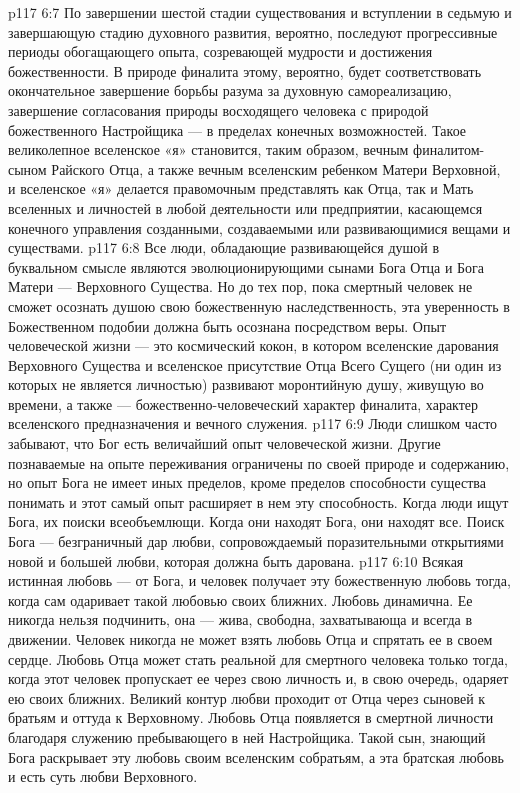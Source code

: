 \vs p117 6:7 По завершении шестой стадии существования и вступлении в седьмую и завершающую стадию духовного развития, вероятно, последуют прогрессивные периоды обогащающего опыта, созревающей мудрости и достижения божественности. В природе финалита этому, вероятно, будет соответствовать окончательное завершение борьбы разума за духовную самореализацию, завершение согласования природы восходящего человека с природой божественного Настройщика --- в пределах конечных возможностей. Такое великолепное вселенское «я» становится, таким образом, вечным финалитом\hyp{}сыном Райского Отца, а также вечным вселенским ребенком Матери Верховной, и вселенское «я» делается правомочным представлять как Отца, так и Мать вселенных и личностей в любой деятельности или предприятии, касающемся конечного управления созданными, создаваемыми или развивающимися вещами и существами.
\vs p117 6:8 Все люди, обладающие развивающейся душой в буквальном смысле являются эволюционирующими сынами Бога Отца и Бога Матери --- Верховного Существа. Но до тех пор, пока смертный человек не сможет осознать душою свою божественную наследственность, эта уверенность в Божественном подобии должна быть осознана посредством веры. Опыт человеческой жизни --- это космический кокон, в котором вселенские дарования Верховного Существа и вселенское присутствие Отца Всего Сущего (ни один из которых не является личностью) развивают моронтийную душу, живущую во времени, а также --- божественно\hyp{}человеческий характер финалита, характер вселенского предназначения и вечного служения.
\vs p117 6:9 \pc Люди слишком часто забывают, что Бог есть величайший опыт человеческой жизни. Другие познаваемые на опыте переживания ограничены по своей природе и содержанию, но опыт Бога не имеет иных пределов, кроме пределов способности существа понимать и этот самый опыт расширяет в нем эту способность. Когда люди ищут Бога, их поиски всеобъемлющи. Когда они находят Бога, они находят все. Поиск Бога --- безграничный дар любви, сопровождаемый поразительными открытиями новой и большей любви, которая должна быть дарована.
\vs p117 6:10 Всякая истинная любовь --- от Бога, и человек получает эту божественную любовь тогда, когда сам одаривает такой любовью своих ближних. Любовь динамична. Ее никогда нельзя подчинить, она --- жива, свободна, захватывающа и всегда в движении. Человек никогда не может взять любовь Отца и спрятать ее в своем сердце. Любовь Отца может стать реальной для смертного человека только тогда, когда этот человек пропускает ее через свою личность и, в свою очередь, одаряет ею своих ближних. Великий контур любви проходит от Отца через сыновей к братьям и оттуда к Верховному. Любовь Отца появляется в смертной личности благодаря служению пребывающего в ней Настройщика. Такой сын, знающий Бога раскрывает эту любовь своим вселенским собратьям, а эта братская любовь и есть суть любви Верховного.
